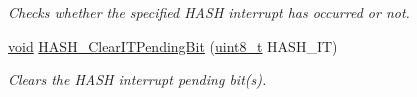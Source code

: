 \begin{DoxyCompactItemize}
\begin{DoxyCompactList}\small\item\em Checks whether the specified H\-A\-S\-H interrupt has occurred or not. \end{DoxyCompactList}\item 
\hyperlink{group___n_a_m_e_ga18028b8badbf1ea7e704ccac3c488e82}{void} \hyperlink{group___h_a_s_h___group5_ga97b9508f09c6fb572f65832f124da26d}{H\-A\-S\-H\-\_\-\-Clear\-I\-T\-Pending\-Bit} (\hyperlink{stdint_8h_aba7bc1797add20fe3efdf37ced1182c5}{uint8\-\_\-t} H\-A\-S\-H\-\_\-\-I\-T)
\begin{DoxyCompactList}\small\item\em Clears the H\-A\-S\-H interrupt pending bit(s). \end{DoxyCompactList}\end{DoxyCompactItemize}


